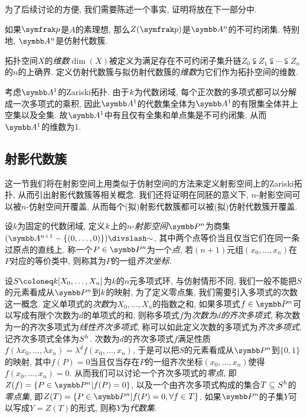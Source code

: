 为了后续讨论的方便, 我们需要陈述一个事实, 证明将放在下一部分中.

\begin{proposition}\label{prop:affineprimeirreducible}
  如果$\ideal{p}$是$A$的素理想, 那么$Z(\ideal{p})$是$\AF^n$的不可约闭集. 特别地, $\AF^n$是仿射代数簇.
\end{proposition}

\begin{definition}
  拓扑空间$X$的\emph{维数}$\dim (X)$被定义为满足存在不可约闭子集升链$Z_0\subsetneqq Z_1\subsetneqq \dotsb \subsetneqq Z_n$的$n$的上确界. 定义仿射代数簇与拟仿射代数簇的\emph{维数}为它们作为拓扑空间的维数.
\end{definition}

\begin{example}
  考虑$\AF^1$的Zariski拓扑. 由于$k$为代数闭域, 每个正次数的多项式都可以分解成一次多项式的乘积, 因此$\AF^1$的代数集全体为$\AF^1$的有限集全体并上空集以及全集. 故$\AF^1$中有且仅有全集和单点集是不可约闭集, 从而$\AF^1$的维数为1.
\end{example}

\subsection{射影代数簇}

这一节我们将在射影空间上用类似于仿射空间的方法来定义射影空间上的Zariski拓扑, 从而引出射影代数簇等相关概念. 我们还将证明在同胚的意义下, $n$-射影空间可以被$n$-仿射空间开覆盖, 从而每个(拟)射影代数簇都可以被(拟)仿射代数簇开覆盖.

\begin{definition}
  设$k$为固定的代数闭域, 定义$k$上的$n$-\emph{射影空间}$\PP^n$为商集$(\AF^{n+1}-\{(0, \dotsc, 0)\}){\divslash}{\sim}$, 其中两个点等价当且仅当它们在同一条过原点的直线上. 称一个$P\in\PP^n$为一个\emph{点}, 若$(n+1)$元组$(x_0, \dotsc, x_n)$在$P$对应的等价类中, 则称其为$P$的一组\emph{齐次坐标}.
\end{definition}

\begin{definition}
  设$S\coloneq \kk [X_0, \dotsc, X_n]$为$k$的$n$元多项式环, 与仿射情形不同, 我们一般不能把$S$的元素看成从$\PP^n$到$k$的映射, 为了定义零点集, 我们需要引入多项式的次数这一概念. 定义单项式的\emph{次数}为$X_0, \dotsc, X_n$的指数之和, 如果多项式$f\in \PP^n$可以写成有限个次数为$d$的单项式的和, 则称多项式$f$为\emph{次数为$d$的齐次多项式}, 称次数为一的齐次多项式为\emph{线性齐次多项式}, 称可以如此定义次数的多项式为\emph{齐次多项式}, 记齐次多项式全体为$S^h$. 次数为$d$的齐次多项式$f$满足性质$f(\lambda x_0, \dotsc, \lambda x_n)=\lambda^d f(x_0, \dotsc, x_n)$, 于是可以把$S$的元素看成从$\PP^n$到$\{0, 1\}$的映射, 其中$f(P)=0$当且仅当存在$P$的一组齐次坐标$(x_0, \dotsc, x_n)$使得$f(x_0, \dotsc, x_n)=0$. 从而我们可以讨论一个齐次多项式的\emph{零点}, 即$Z(f)=\{P\in \PP^n\vert f(P)=0\}$, 以及一个由齐次多项式构成的集合$T\subseteq S^h$的\emph{零点集}, 即$Z(T)=\{P\in\PP^n\vert f(P)=0, \forall f\in T\}$. 如果$\PP^n$的子集$Y$可以写成$Y=Z(T)$的形式, 则称$Y$为\emph{代数集}.
\end{definition}

